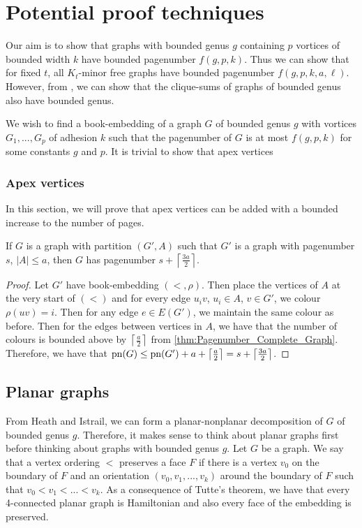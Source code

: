 
\chapter{Potential proof techniques}\label{chap:Proving_The_Theorem}
Our aim is to show that graphs with bounded genus $g$ containing $p$ vortices of bounded width $k$ have bounded pagenumber $f(g, p, k)$. Thus we can show that for fixed $t$, all $K_t$-minor free graphs have bounded pagenumber $f(g, p, k, a, \ell)$. However, from \cite{hickingbothamStackNumberCliqueSum2023}, we can show that the clique-sums of graphs of bounded genus also have bounded genus.

We wish to find a book-embedding of a graph $G$ of bounded genus $g$ with vortices $G_1, ..., G_p$ of adhesion $k$ such that the pagenumber of $G$ is at most $f(g, p, k)$ for some constants $g$ and $p$. It is trivial to show that apex vertices 
\subsection{Apex vertices}
In this section, we will prove that apex vertices can be added with a bounded increase to the number of pages.
\begin{theorem}
	If $G$ is a graph with partition $(G', A)$ such that $G'$ is a graph with pagenumber $s$, $|A| \leq a$, then $G$ has pagenumber $s + \left\lceil \frac{3a}{2}\right\rceil$. 
\end{theorem}
\begin{proof}
	Let $G'$ have book-embedding $(<, \rho)$. Then place the vertices of $A$ at the very start of $(<)$ and for every edge $u_iv$, $u_i \in A$, $v \in G'$, we colour $\rho(uv) = i$. Then for any edge $e \in E(G')$, we maintain the same colour as before. Then for the edges between vertices in $A$, we have that the number of colours is bounded above by $\left\lceil \frac{a}{2} \right\rceil$ from \cref{thm:Pagenumber_Complete_Graph}. Therefore, we have that $\text{pn}(G) \leq \text{pn}(G') + a + \left\lceil \frac{a}{2} \right\rceil =s + \left\lceil \frac{3a}{2}\right\rceil$. 
\end{proof}

\section{Planar graphs}
From Heath and Istrail, we can form a planar-nonplanar decomposition of $G$ of bounded genus $g$. Therefore, it makes sense to think about planar graphs first before thinking about graphs with bounded genus $g$.
Let $G$ be a graph. We say that a vertex ordering $<$ preserves a face $F$ if there is a vertex $v_0$ on the boundary of $F$ and an orientation $(v_0, v_1, ..., v_k)$ around the boundary of $F$ such that $v_0 < v_1 < ... < v_k$. 
As a consequence of Tutte's theorem, we have that every 4-connected planar graph is Hamiltonian and also every face of the embedding is preserved. 

